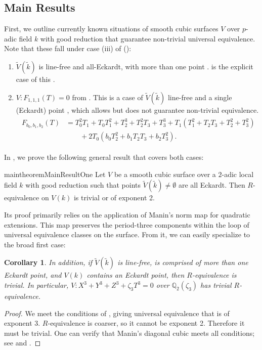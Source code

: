 \documentclass[11pt]{article}
\newtheorem{corollary}[theorem]{Corollary}
\theoremstyle{definition}
\begin{document}
\subsection{Main Results}

First, we outline currently known situations of smooth cubic surfaces $V$ over $p$-adic field $k$ with good reduction that guarantee non-trivial universal equivalence. Note that these fall under case (iii) of \cite[Thm.~2]{swinnertondyer} ():
\begin{enumerate}
    \item $\tilde{V}(\tilde{k})$ is line-free and all-Eckardt, with more than one point \cite[Cor.~2.5]{dimitrikanevsky}.  is the explicit case of this \cite[Ex.~II.6.5]{manin3firstedition} \cite[Ex.~1.6.i]{dimitrikanevsky}.
    \item $V : F_{1,1,1}(T) = 0$ from . This is a case of $\tilde{V}(\tilde{k})$ line-free and a single (Eckardt) point \cite[\S 3.4]{dimitrikanevsky}, which allows but does not guarantee non-trivial equivalence.
    \begin{align}
\label{eq:main}
\begin{split}
F_{b_0, b_1, b_2}(T) &= T_0^2T_1 + T_0T_1^2 + T_2^3 + T_2^2T_3 + T_3^3 + T_1(T_1^2+T_2T_3+T_2^2+T_3^2)\\
&\quad\quad+ 2T_0(b_0T_2^2+b_1T_2T_3+ b_2T_3^2).
\end{split}
\end{align}
\end{enumerate}
In , we prove the following general result that covers both cases:
\begin{restatable}{maintheorem}{MainResultOne}
\label{thm:main}
\label{thm:eckardt_conditions}
Let $V$ be a smooth cubic surface over a $2$-adic local field $k$
with good reduction such that points $\tilde{V}(\tilde{k}) \ne \emptyset$ are all Eckardt.
Then $R$-equivalence on $V(k)$ is trivial or of exponent 2.
\end{restatable}
Its proof primarily relies on the application of Manin's norm map for quadratic extensions. This map preserves the period-three components within the loop of universal equivalence classes on the surface. From it, we can easily specialize to the broad first case:
\begin{corollary}
\label{thm:manin}
In addition, if $\tilde{V}(\tilde{k})$ is line-free, is comprised of more than one Eckardt point, and $V(k)$ contains an Eckardt point, then $R$-equivalence is trivial. In particular, $V : X^3 + Y^3 + Z^3 + \zeta_3 T^3 = 0$ over $\mathbb{Q}_2(\zeta_3)$ has trivial $R$-equivalence.
\end{corollary}
\begin{proof}
We meet the conditions of \cite[Cor.~1.5]{dimitrikanevsky}, giving universal equivalence that is of exponent 3. $R$-equivalence is coarser, so it cannot be exponent 2. Therefore it must be trivial. One can verify that Manin's diagonal cubic meets all conditions; see \cite[\S 8]{swinnertondyer} and \cite[Ex.~1.6.i]{dimitrikanevsky}.
\end{proof}
\end{document}
